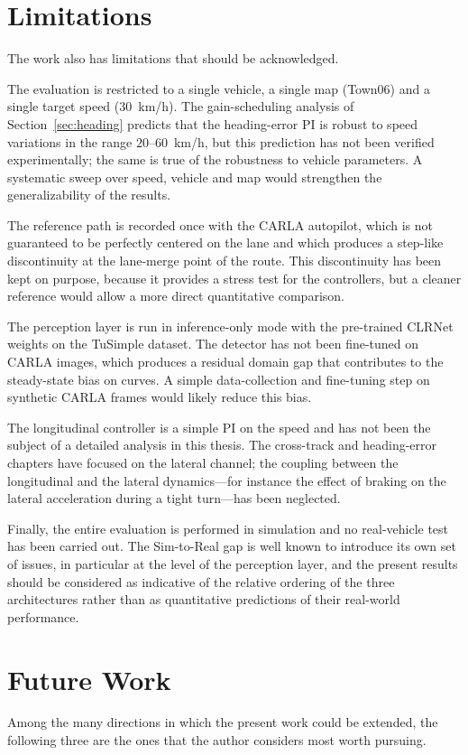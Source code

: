 \section{Limitations}
The work also has limitations that should be acknowledged.

The evaluation is restricted to a single vehicle, a single map (Town06) and a single target speed ($30$~km/h). The gain-scheduling analysis of Section~\ref{sec:heading} predicts that the heading-error PI is robust to speed variations in the range $20$--$60$~km/h, but this prediction has not been verified experimentally; the same is true of the robustness to vehicle parameters. A systematic sweep over speed, vehicle and map would strengthen the generalizability of the results.

The reference path is recorded once with the CARLA autopilot, which is not guaranteed to be perfectly centered on the lane and which produces a step-like discontinuity at the lane-merge point of the route. This discontinuity has been kept on purpose, because it provides a stress test for the controllers, but a cleaner reference would allow a more direct quantitative comparison.

The perception layer is run in inference-only mode with the pre-trained CLRNet weights on the TuSimple dataset. The detector has not been fine-tuned on CARLA images, which produces a residual domain gap that contributes to the steady-state bias on curves. A simple data-collection and fine-tuning step on synthetic CARLA frames would likely reduce this bias.

The longitudinal controller is a simple PI on the speed and has not been the subject of a detailed analysis in this thesis. The cross-track and heading-error chapters have focused on the lateral channel; the coupling between the longitudinal and the lateral dynamics---for instance the effect of braking on the lateral acceleration during a tight turn---has been neglected.

Finally, the entire evaluation is performed in simulation and no real-vehicle test has been carried out. The Sim-to-Real gap is well known to introduce its own set of issues, in particular at the level of the perception layer, and the present results should be considered as indicative of the relative ordering of the three architectures rather than as quantitative predictions of their real-world performance.

\section{Future Work}
Among the many directions in which the present work could be extended, the following three are the ones that the author considers most worth pursuing.

